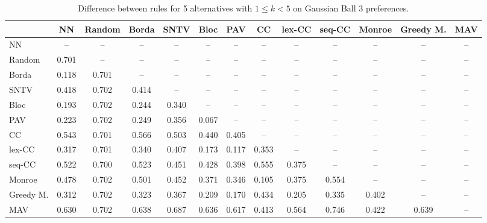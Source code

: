 
\begin{table*}[h!]
\centering
\begin{tabular}{lcccccccccccc}
\toprule
 & NN & Random & Borda & SNTV & Bloc & PAV & CC & lex-CC & seq-CC & Monroe & Greedy M. & MAV \\
\midrule
NN & -- & -- & -- & -- & -- & -- & -- & -- & -- & -- & -- & -- \\
Random & 0.701 & -- & -- & -- & -- & -- & -- & -- & -- & -- & -- & -- \\
Borda & 0.118 & 0.701 & -- & -- & -- & -- & -- & -- & -- & -- & -- & -- \\
SNTV & 0.418 & 0.702 & 0.414 & -- & -- & -- & -- & -- & -- & -- & -- & -- \\
Bloc & 0.193 & 0.702 & 0.244 & 0.340 & -- & -- & -- & -- & -- & -- & -- & -- \\
PAV & 0.223 & 0.702 & 0.249 & 0.356 & 0.067 & -- & -- & -- & -- & -- & -- & -- \\
CC & 0.543 & 0.701 & 0.566 & 0.503 & 0.440 & 0.405 & -- & -- & -- & -- & -- & -- \\
lex-CC & 0.317 & 0.701 & 0.340 & 0.407 & 0.173 & 0.117 & 0.353 & -- & -- & -- & -- & -- \\
seq-CC & 0.522 & 0.700 & 0.523 & 0.451 & 0.428 & 0.398 & 0.555 & 0.375 & -- & -- & -- & -- \\
Monroe & 0.478 & 0.702 & 0.501 & 0.452 & 0.371 & 0.346 & 0.105 & 0.375 & 0.554 & -- & -- & -- \\
Greedy M. & 0.312 & 0.702 & 0.323 & 0.367 & 0.209 & 0.170 & 0.434 & 0.205 & 0.335 & 0.402 & -- & -- \\
MAV & 0.630 & 0.702 & 0.638 & 0.687 & 0.636 & 0.617 & 0.413 & 0.564 & 0.746 & 0.422 & 0.639 & -- \\
\bottomrule
\end{tabular}

\caption{Difference between rules for 5 alternatives with $1 \leq k < 5$ on Gaussian Ball 3 preferences.}
\end{table*}
